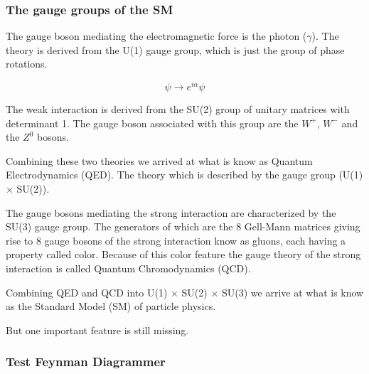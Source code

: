 
\subsubsection{The gauge groups of the SM}
The gauge boson mediating the electromagnetic force is the photon ($\gamma$). The theory is derived from the U(1) gauge group, which is just the group of phase rotations.

\begin{equation}
    \psi \rightarrow e^{i\alpha} \psi
\end{equation}

The weak interaction is derived from the SU(2) group of unitary matrices with determinant 1. The gauge boson associated with this group are the $W^+$, $W^-$ and the $Z^0$ bosons.

Combining these two theories we arrived at what is know as Quantum Electrodynamics (QED). The theory which is described by the gauge group (U(1) $\times$ SU(2)).

The gauge bosons mediating the strong interaction are characterized by the SU(3) gauge group. The generators of which are the 8 Gell-Mann matrices giving rise to 8 gauge bosons of the strong interaction know as gluons, each having a property called color. Because of this color feature the gauge theory of the strong interaction is called Quantum Chromodynamics (QCD).

Combining QED and QCD into U(1) $\times$ SU(2) $\times$ SU(3) we arrive at what is know as the Standard Model (SM) of particle physics.

But one important feature is still missing.


\subsubsection{Test Feynman Diagrammer}

